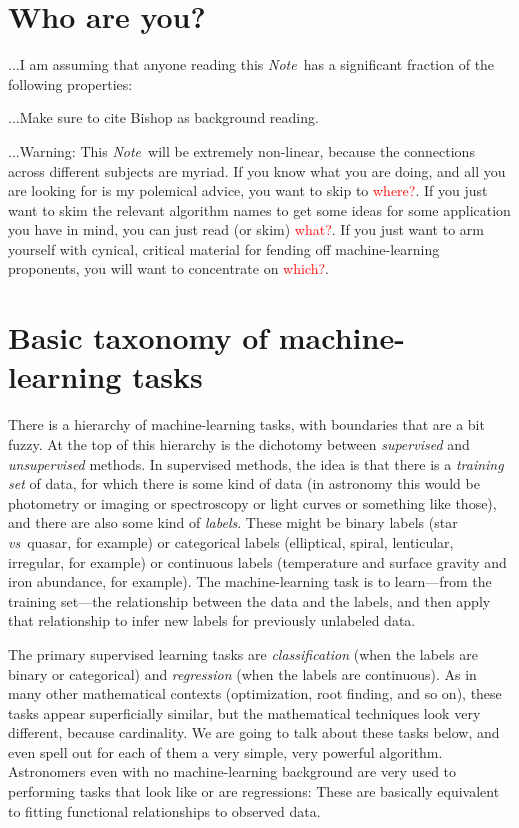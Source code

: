 \documentclass[12pt, twoside, letterpaper]{article}
\newcommand{\documentname}{\textsl{Note}}
\newcommand{\foreign}[1]{\textsl{#1}}
\newcommand{\vs}{\foreign{vs}}
\newcommand{\todo}[1]{\textcolor{red}{#1}}  %
\begin{document}
\section{Who are you?}

...I am assuming that anyone reading this \documentname\ has a
significant fraction of the following properties:

...Make sure to cite Bishop as background reading.

...Warning: This \documentname\ will be extremely non-linear, because
the connections across different subjects are myriad. If you know what
you are doing, and all you are looking for is my polemical advice, you
want to skip to \todo{where?}. If you just want to skim the relevant
algorithm names to get some ideas for some application you have in
mind, you can just read (or skim) \todo{what?}. If you just want to arm
yourself with cynical, critical material for fending off machine-learning
proponents, you will want to concentrate on \todo{which?}.

\section{Basic taxonomy of machine-learning tasks}

There is a hierarchy of machine-learning tasks, with boundaries that
are a bit fuzzy.
At the top of this hierarchy is the dichotomy between \emph{supervised}
and \emph{unsupervised} methods.
In supervised methods, the idea is that there is a \emph{training set}
of data, for which there is some kind of data (in astronomy this would
be photometry or imaging or spectroscopy or light curves or something like those),
and there are also some kind of \emph{labels}.
These might be binary labels (star \vs\ quasar, for example) or
categorical labels (elliptical, spiral, lenticular, irregular, for
example) or continuous labels (temperature and surface gravity and
iron abundance, for example).
The machine-learning task is to learn---from the training set---the
relationship between the data and the labels, and then apply that
relationship to infer new labels for previously unlabeled data.

The primary supervised learning tasks are \emph{classification} (when
the labels are binary or categorical) and \emph{regression} (when the
labels are continuous).
As in many other mathematical contexts (optimization, root finding,
and so on), these tasks appear superficially similar, but the mathematical
techniques look very different, because cardinality.
We are going to talk about these tasks below, and even spell out for
each of them a very simple, very powerful algorithm.
Astronomers even with no machine-learning background are very used
to performing tasks that look like or are regressions:
These are basically equivalent to fitting functional relationships to
observed data.
\end{document}
